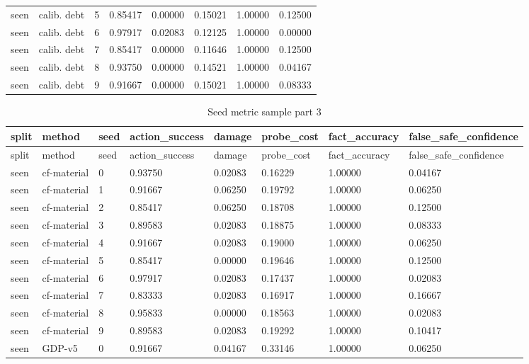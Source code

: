 \documentclass{article}
\begin{document}
\begin{center}
\begin{longtable}{llllllll}
seen & calib. debt & 5 & 0.85417 & 0.00000 & 0.15021 & 1.00000 & 0.12500 \\
seen & calib. debt & 6 & 0.97917 & 0.02083 & 0.12125 & 1.00000 & 0.00000 \\
seen & calib. debt & 7 & 0.85417 & 0.00000 & 0.11646 & 1.00000 & 0.12500 \\
seen & calib. debt & 8 & 0.93750 & 0.00000 & 0.14521 & 1.00000 & 0.04167 \\
seen & calib. debt & 9 & 0.91667 & 0.00000 & 0.15021 & 1.00000 & 0.08333 \\
\bottomrule
\end{longtable}
\renewcommand{\arraystretch}{1.0}
\end{center}


\begin{center}
\tiny
\renewcommand{\arraystretch}{0.92}
\setlength{\tabcolsep}{3pt}
\begin{longtable}{llllllll}
\caption{Seed metric sample part 3}\label{tab:seed-metric-sample-3}\\
\toprule
split & method & seed & action\_success & damage & probe\_cost & fact\_accuracy & false\_safe\_confidence \\
\midrule
\endfirsthead
\toprule
split & method & seed & action\_success & damage & probe\_cost & fact\_accuracy & false\_safe\_confidence \\
\midrule
\endhead
seen & cf-material & 0 & 0.93750 & 0.02083 & 0.16229 & 1.00000 & 0.04167 \\
seen & cf-material & 1 & 0.91667 & 0.06250 & 0.19792 & 1.00000 & 0.06250 \\
seen & cf-material & 2 & 0.85417 & 0.06250 & 0.18708 & 1.00000 & 0.12500 \\
seen & cf-material & 3 & 0.89583 & 0.02083 & 0.18875 & 1.00000 & 0.08333 \\
seen & cf-material & 4 & 0.91667 & 0.02083 & 0.19000 & 1.00000 & 0.06250 \\
seen & cf-material & 5 & 0.85417 & 0.00000 & 0.19646 & 1.00000 & 0.12500 \\
seen & cf-material & 6 & 0.97917 & 0.02083 & 0.17437 & 1.00000 & 0.02083 \\
seen & cf-material & 7 & 0.83333 & 0.02083 & 0.16917 & 1.00000 & 0.16667 \\
seen & cf-material & 8 & 0.95833 & 0.00000 & 0.18563 & 1.00000 & 0.02083 \\
seen & cf-material & 9 & 0.89583 & 0.02083 & 0.19292 & 1.00000 & 0.10417 \\
seen & GDP-v5 & 0 & 0.91667 & 0.04167 & 0.33146 & 1.00000 & 0.06250 \\

\end{longtable}
\end{center}
\end{document}
